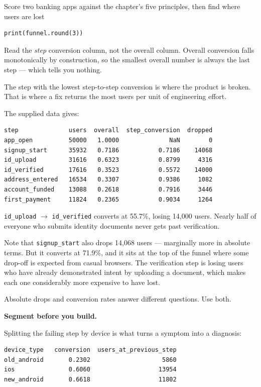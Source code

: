 \begin{labproject}{Score two banking apps against the chapter's five principles, then find where users are lost}
\begin{lstlisting}[style=mlpython]
print(funnel.round(3))
\end{lstlisting}

\begin{keyidea}
Read the \emph{step} conversion column, not the overall column. Overall conversion falls monotonically by construction, so the smallest overall number is always the last step --- which tells you nothing.

The step with the lowest step-to-step conversion is where the product is broken. That is where a fix returns the most users per unit of engineering effort.
\end{keyidea}

The supplied data gives:

\begin{lstlisting}[style=mlterminal]
step              users  overall  step_conversion  dropped
app_open          50000   1.0000              NaN        0
signup_start      35932   0.7186           0.7186    14068
id_upload         31616   0.6323           0.8799     4316
id_verified       17616   0.3523           0.5572    14000
address_entered   16534   0.3307           0.9386     1082
account_funded    13088   0.2618           0.7916     3446
first_payment     11824   0.2365           0.9034     1264
\end{lstlisting}

\begin{workedexample}
\texttt{id\_upload} $\rightarrow$ \texttt{id\_verified} converts at 55.7\%, losing 14{,}000 users. Nearly half of everyone who submits identity documents never gets past verification.

Note that \texttt{signup\_start} also drops 14{,}068 users --- marginally more in absolute terms. But it converts at 71.9\%, and it sits at the top of the funnel where some drop-off is expected from casual browsers. The verification step is losing users who have already demonstrated intent by uploading a document, which makes each one considerably more expensive to have lost.

Absolute drops and conversion rates answer different questions. Use both.
\end{workedexample}

\medskip\noindent\textbf{Segment before you build.}\par
Splitting the failing step by device is what turns a symptom into a diagnosis:

\begin{lstlisting}[style=mlterminal]
device_type   conversion  users_at_previous_step
old_android       0.2302                    5860
ios               0.6060                   13954
new_android       0.6618                   11802


\end{lstlisting}
\end{labproject}
